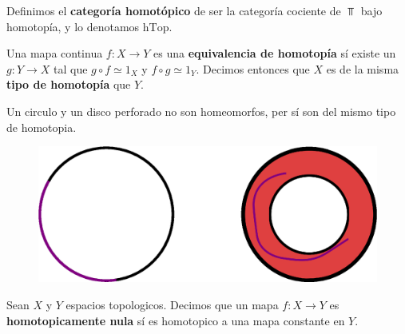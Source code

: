 \begin{definition}
    Definimos el \textbf{categor\'ia homot\'opico} de ser la categor\'ia
    cociente de $\Top$ bajo homotop\'ia, y lo denotamos  $\text{hTop}$.
\end{definition}

\begin{definition}
    Una mapa continua $f:X \xrightarrow{} Y$ es una \textbf{equivalencia de
    homotop\'ia} s\'i existe un $g:Y \xrightarrow{} X$ tal que $g \circ f \simeq
    1_X$ y  $f \circ g \simeq 1_Y$. Decimos entonces que $X$ es de la misma
    \textbf{tipo de homotop\'ia} que $Y$.
\end{definition}

\begin{example}\label{}
    Un circulo y un disco perforado no son homeomorfos, per s\'i son del mismo
    tipo de homotopia.
    \begin{figure}[h]
        \centering
        \includegraphics[scale=0.5]{Figures/homotopy_equivalence.eps}
        \caption{}
        \label{fig_15}
    \end{figure}
\end{example}

\begin{definition}
    Sean $X$ y  $Y$ espacios topologicos. Decimos que un mapa $f:X
    \xrightarrow{} Y$ es \textbf{homotopicamente nula} s\'i es homotopico a una
    mapa constante en $Y$.
\end{definition}
